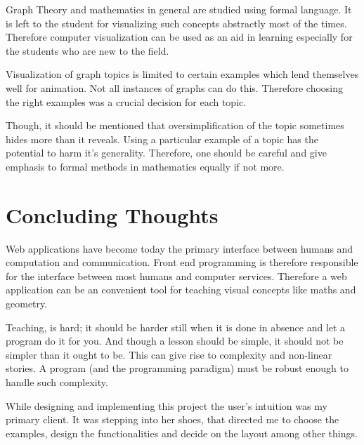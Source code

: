 Graph Theory and mathematics in general are studied using formal language. It
is left to the student for visualizing such concepts abstractly most of the
times. Therefore computer visualization can be used as an aid in learning
especially for the students who are new to the field.

Visualization of graph topics is limited to certain examples which lend
themselves well for animation. Not all instances of graphs can do this.
Therefore choosing the right examples was a crucial decision for each topic.

Though, it should be mentioned that oversimplification of the topic sometimes
hides more than it reveals. Using a particular example of a topic has the
potential to harm it's generality. Therefore, one should be careful and give
emphasis to formal methods in mathematics equally if not more.

\section{Concluding Thoughts}

Web applications have become today the primary interface between humans and
computation and communication. Front end programming is therefore responsible
for the interface between most humans and computer services. Therefore a web
application can be an convenient tool for teaching visual concepts like maths
and geometry.

Teaching, is hard; it should be harder still when it is done in absence and let
a program do it for you. And though a lesson should be simple, it should not
be simpler than it ought to be. This can give rise to complexity and non-linear
stories. A program (and the programming paradigm) must be robust enough to
handle such complexity. 

While designing and implementing this project the user's intuition was my
primary client. It was stepping into her shoes, that directed me to choose the
examples, design the functionalities and decide on the layout among other
things.
